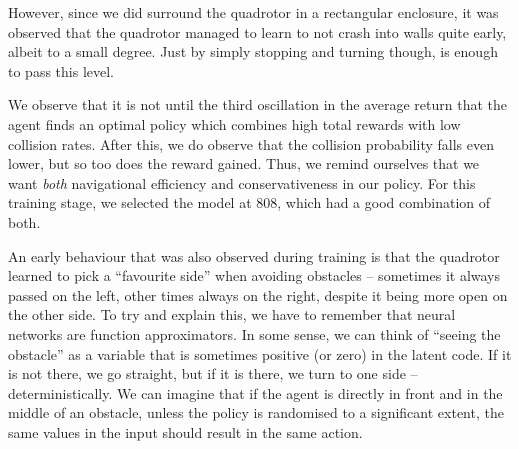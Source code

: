 However, since we did surround the quadrotor in a rectangular enclosure, it was observed that the quadrotor managed to learn to not crash into walls quite early, albeit to a small degree. Just by simply stopping and turning though, is enough to pass this level.

We observe that it is not until the third oscillation in the average return that the agent finds an optimal policy which combines high total rewards with low collision rates. After this, we do observe that the collision probability falls even lower, but so too does the reward gained. Thus, we remind ourselves that we want \textit{both} navigational efficiency and conservativeness in our policy. For this training stage, we selected the model at 808, which had a good combination of both.

An early behaviour that was also observed during training is that the quadrotor learned to pick a ``favourite side'' when avoiding obstacles -- sometimes it always passed on the left, other times always on the right, despite it being more open on the other side. To try and explain this, we have to remember that neural networks are function approximators. In some sense, we can think of ``seeing the obstacle'' as a variable that is sometimes positive (or zero) in the latent code. If it is not there, we go straight, but if it is there, we turn to one side -- deterministically. We can imagine that if the agent is directly in front and in the middle of an obstacle, unless the policy is randomised to a significant extent, the same values in the input should result in the same action.

